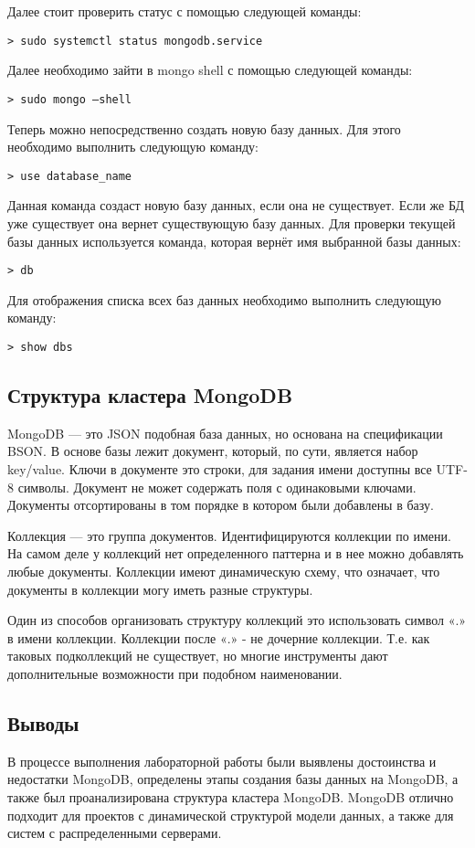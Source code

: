 Далее стоит проверить статус с помощью следующей команды:
\begin{lstlisting}
> sudo systemctl status mongodb.service
\end{lstlisting}

Далее необходимо зайти в mongo shell с помощью следующей команды:
\begin{lstlisting}
> sudo mongo –shell
\end{lstlisting}

Теперь можно непосредственно создать новую базу данных. Для этого необходимо выполнить следующую команду:
\begin{lstlisting}
> use database_name
\end{lstlisting}

Данная команда создаст новую базу данных, если она не существует. Если же БД уже существует она вернет существующую базу данных. Для проверки текущей базы данных используется команда, которая вернёт имя выбранной базы данных:
\begin{lstlisting}
> db
\end{lstlisting}

Для отображения списка всех баз данных необходимо выполнить следующую команду:
\begin{lstlisting}
> show dbs
\end{lstlisting}

\subsection{Структура кластера MongoDB}
MongoDB --- это JSON подобная база данных, но основана на спецификации BSON. В основе базы лежит документ, который, по сути, является набор key/value. Ключи в документе это строки, для задания имени доступны все UTF-8 символы. Документ не может содержать поля с одинаковыми ключами. Документы отсортированы в том порядке в котором были добавлены в базу.

Коллекция --- это группа документов. Идентифицируются коллекции по имени. На самом деле у коллекций нет определенного паттерна и в нее можно добавлять любые документы. Коллекции имеют динамическую схему, что означает, что документы в коллекции могу иметь разные структуры.

Один из способов организовать структуру коллекций это использовать символ «.» в имени коллекции. Коллекции после «.» - не дочерние коллекции. Т.е. как таковых подколлекций не существует, но многие инструменты дают дополнительные возможности при подобном наименовании.

\subsection*{Выводы}
В процессе выполнения лабораторной работы были выявлены достоинства и недостатки MongoDB, определены этапы создания базы данных на MongoDB, а также был проанализирована структура кластера MongoDB. MongoDB отлично подходит для проектов с динамической структурой модели данных, а также для систем с распределенными серверами.


